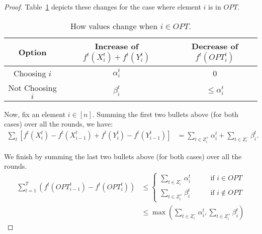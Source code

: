 \documentclass[final,12pt]{colt2018}
\newcommand{\Yes}[1][i]{Z^+_{#1}}
\newcommand{\No}[1][i]{Z^-_{#1}}
\begin{document}
\begin{proof}
  Table~\ref{tab:usm-iopt} depicts these changes for the case where element $i$ is in $OPT$.
  \begin{table}
  \centering
  \begin{tabular}{ c | c | c }
    Option & Increase of $f^t(X^t_i) + f^t(Y^t_i)$ & Decrease of $f^t(OPT^t_i)$ \\ \hline
    Choosing $i$ & $\alpha^t_i$ & 0 \\
    Not Choosing $i$ & $\beta^t_i$ & $\le \alpha^t_i$ \\
  \end{tabular}
  \caption{How values change when $i \in OPT$.}
  \label{tab:usm-iopt}
  \end{table}
  
  Now, fix an element $i \in [n]$. Summing the first two bullets above (for both cases) over all the rounds, we have:
  \begin{align}
    \sum_t \left[ f^t(X^t_i) - f^t(X^t_{i-1}) + f^t(Y^t_i) - f^t(Y^t_{i-1}) \right]
      &= \sum_{t \in \Yes} \alpha^t_i + \sum_{t \in \No}
        \beta^t_i. \label{eqn:fn} 
  \end{align}
  
  We finish by summing the last two bullets above (for both cases) over all the rounds.
  \begin{align}
    \sum_{t=1}^T \left( f^t(OPT^t_{i-1}) - f^t(OPT^t_i) \right)
      &\le \begin{cases}
        \sum_{t \in \No} \alpha^t_i
          &\qquad \text{if } i \in OPT \\
        \sum_{t \in \Yes} \beta^t_i
          &\qquad \text{if } i \not \in OPT
      \end{cases} \nonumber \\
      &\le \max \left(
        \sum_{t \in \No} \alpha^t_i,
        \sum_{t \in \Yes} \beta^t_i
      \right) \label{ieq:opt}
  \end{align}
  

\end{proof}
\end{document}
